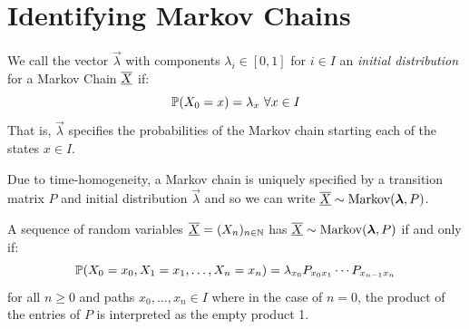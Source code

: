 \documentclass[../main.tex]{subfiles}
\begin{document}
\section{Identifying Markov Chains}
\begin{definition}
  We call the vector $\vec{\lambda}$ with components $\lambda_i \in [0, 1]$ for $i \in I$ an \textit{initial distribution} for a Markov Chain $\mchain{X}$ if:
  \[
    \P(X_0 = x) = \lambda_x\ \forall x \in I
  \]
  That is, $\vec{\lambda}$ specifies the probabilities of the Markov chain starting each of the states $x \in I$.
\end{definition}
\begin{remark}[Notation]
  Due to time-homogeneity, a Markov chain is uniquely specified by a transition matrix $P$ and initial distribution $\vec{\lambda}$ and so we can write $\mchain{X} \sim \markov(\vec{\lambda}, P)$.
\end{remark}
\begin{theorem}
  A sequence of random variables $\mchain{X} = (X_n)_{n \in \N}$ has $\mchain{X} \sim \markov(\vec{\lambda}, P)$ if and only if: \label{markovCond}
  \[
    \P(X_0 = x_0, X_1 = x_1, \ldots, X_n = x_n) = \lambda_{x_0} P_{x_0 x_1} \cdots P_{x_{n - 1} x_n}
  \]
  for all $n \geq 0$ and paths $x_0, \ldots, x_n \in I$ where in the case of $n = 0$, the product of the entries of $P$ is interpreted as the empty product 1.
\end{theorem}
\end{document}
